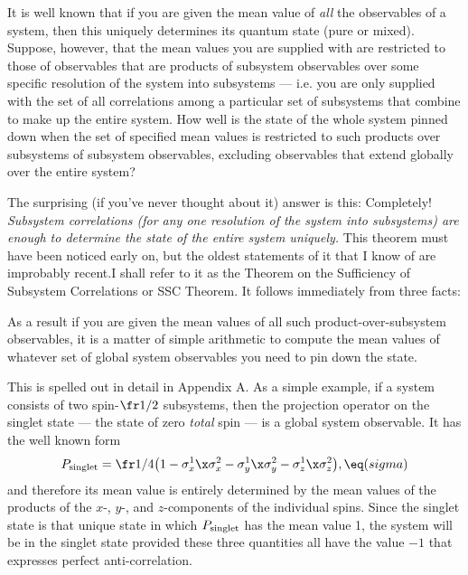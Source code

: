  It is well known that if you are given the
mean value of {\it all\/} the observables of a system, then this
uniquely determines its quantum state (pure or mixed).  Suppose,
however, that the mean values you are supplied with are restricted to
those of observables that are products of subsystem observables over
some specific resolution of the system into subsystems --- i.e. you
are only supplied with the set of all correlations among a particular
set of subsystems that combine to make up the entire system.  How well
is the state of the whole system pinned down when the set of specified
mean values is restricted to such products over subsystems of
subsystem observables, excluding observables that extend globally
over the entire system?  

The surprising (if you've never thought about it) answer is this:
Completely!  {\it Subsystem correlations (for any one resolution of
the system into subsystems) are enough to determine the state of the
entire system uniquely.} This theorem must have been noticed early on,
but the oldest statements of it that I know of are
improbably recent.\fn I shall refer to it as the Theorem on the
Sufficiency of Subsystem Correlations or SSC Theorem. It follows
immediately from three facts:

 \ni As a result if
you are given the mean values of all such product-over-subsystem
observables, it is a matter of simple arithmetic to compute the mean
values of whatever set of global system observables you need to pin
down the state.  

This is spelled out in detail in Appendix A.  As a simple example, if
a system consists of two spin-$\fr1/2$ subsystems, then the projection
operator on the singlet state --- the state of zero {\it total\/} spin
--- is a global system observable.  It has the well known form
$$P_{\rm singlet} = \fr1/4 \bigl(1- 
\sigma^{1}_x\x\sigma^{2}_x -
\sigma^{1}_y\x\sigma^{2}_y -
\sigma^{1}_z\x\sigma^{2}_z \bigr),\eq(sigma)$$ and therefore its mean
value is entirely determined by the mean values of the products of the
$x$-, $y$-, and $z$-components of the individual spins.  Since the
singlet state is that unique state in which $P_{\rm singlet}$ has the
mean value 1, the system will be in the singlet state provided these
three quantities all have the value $-1$ that expresses perfect
anti-correlation.  

